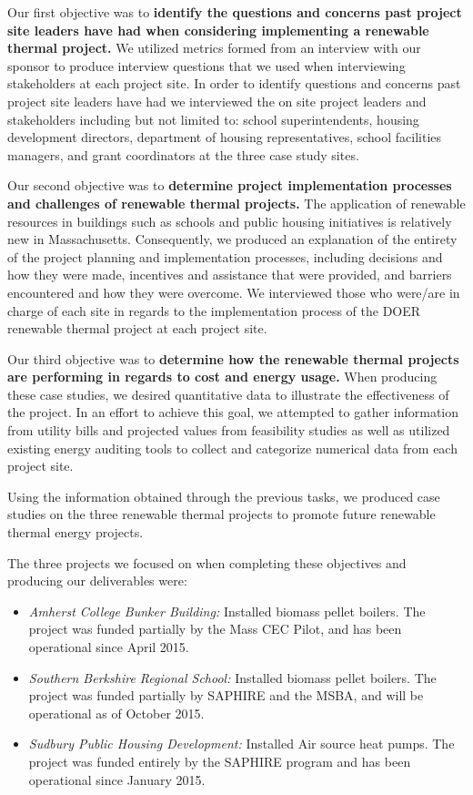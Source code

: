 \par Our first objective was to \textbf{identify the questions and concerns past project site leaders have had when considering implementing a renewable thermal project.} We utilized metrics formed from an interview with our sponsor to produce interview questions that we used when interviewing stakeholders at each project site. In order to identify questions and concerns past project site leaders have had we interviewed the on site project leaders and stakeholders including but not limited to: school superintendents, housing development directors, department of housing representatives, school facilities managers, and grant coordinators at the three case study sites.
\par Our second objective was to \textbf{determine project implementation processes and challenges of renewable thermal projects.} The application of renewable resources in buildings such as schools and public housing initiatives is relatively new in Massachusetts. Consequently, we produced an explanation of the entirety of the project planning and implementation processes, including decisions and how they were made, incentives and assistance that were provided, and barriers encountered and how they were overcome. We interviewed those who were/are in charge of each site in regards to the implementation process of the DOER renewable thermal project at each project site.
\par Our third objective was to \textbf{determine how the renewable thermal projects are performing in regards to cost and energy usage.} When producing these case studies, we desired quantitative data to illustrate the effectiveness of the project. In an effort to achieve this goal, we attempted to gather information from utility bills and projected values from feasibility studies as well as utilized existing energy auditing tools to collect and categorize numerical data from each project site.
\par Using the information obtained through the previous tasks, we produced case studies on the three renewable thermal projects to promote future renewable thermal energy projects.

\noindent
The three projects we focused on when completing these objectives and producing our deliverables were:
\begin{itemize}
  \item{\emph{Amherst College Bunker Building:} Installed biomass pellet boilers. The project was funded partially by the Mass CEC Pilot, and has been operational since April 2015.}
  \item{\emph{Southern Berkshire Regional School:} Installed biomass pellet boilers. The project was funded partially by SAPHIRE and the MSBA, and will be operational as of October 2015.}
  \item{\emph{Sudbury Public Housing Development:} Installed Air source heat pumps. The project was funded entirely by the SAPHIRE program and has been operational since January 2015.}
\end{itemize}

